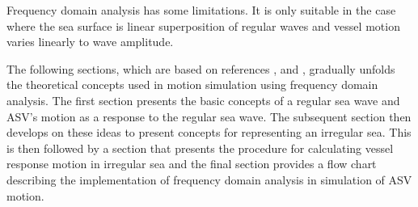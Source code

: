 Frequency domain analysis has some limitations. It is only suitable in the case
where the sea surface is linear superposition of regular waves and vessel motion
varies linearly to wave amplitude.  

The following sections, which are based on references
\cite{lewis1988principles},
\cite{hughes2010ship} and
\cite{bhattacharyya1978dynamics}, 
gradually unfolds the theoretical concepts used in motion simulation using
frequency domain analysis. The first section presents the basic concepts of a
regular sea wave and ASV's motion as a response to the regular sea wave. The
subsequent section then develops on these ideas to present concepts for
representing an irregular sea. This is then followed by a section that presents
the procedure for calculating vessel response motion in irregular sea and the
final section provides a flow chart describing the implementation of frequency
domain analysis in simulation of ASV motion.


